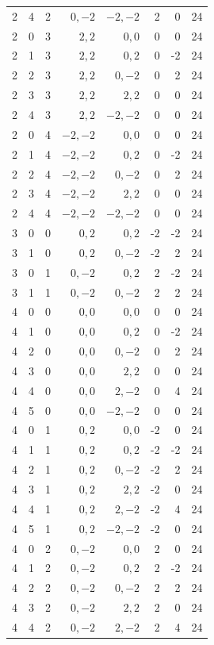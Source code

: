 \documentclass[11pt,a4paper]{article}
\begin{document}
\begin{longtable}{rrrrrrrr}
2 & 4 & 2 & $0,-2$ & $-2,-2$ & 2 & 0 & 24\\
2 & 0 & 3 & $2,2$ & $0,0$ & 0 & 0 & 24\\
2 & 1 & 3 & $2,2$ & $0,2$ & 0 & -2 & 24\\
2 & 2 & 3 & $2,2$ & $0,-2$ & 0 & 2 & 24\\
2 & 3 & 3 & $2,2$ & $2,2$ & 0 & 0 & 24\\
2 & 4 & 3 & $2,2$ & $-2,-2$ & 0 & 0 & 24\\
2 & 0 & 4 & $-2,-2$ & $0,0$ & 0 & 0 & 24\\
2 & 1 & 4 & $-2,-2$ & $0,2$ & 0 & -2 & 24\\
2 & 2 & 4 & $-2,-2$ & $0,-2$ & 0 & 2 & 24\\
2 & 3 & 4 & $-2,-2$ & $2,2$ & 0 & 0 & 24\\
2 & 4 & 4 & $-2,-2$ & $-2,-2$ & 0 & 0 & 24\\
3 & 0 & 0 & $0,2$ & $0,2$ & -2 & -2 & 24\\
3 & 1 & 0 & $0,2$ & $0,-2$ & -2 & 2 & 24\\
3 & 0 & 1 & $0,-2$ & $0,2$ & 2 & -2 & 24\\
3 & 1 & 1 & $0,-2$ & $0,-2$ & 2 & 2 & 24\\
4 & 0 & 0 & $0,0$ & $0,0$ & 0 & 0 & 24\\
4 & 1 & 0 & $0,0$ & $0,2$ & 0 & -2 & 24\\
4 & 2 & 0 & $0,0$ & $0,-2$ & 0 & 2 & 24\\
4 & 3 & 0 & $0,0$ & $2,2$ & 0 & 0 & 24\\
4 & 4 & 0 & $0,0$ & $2,-2$ & 0 & 4 & 24\\
4 & 5 & 0 & $0,0$ & $-2,-2$ & 0 & 0 & 24\\
4 & 0 & 1 & $0,2$ & $0,0$ & -2 & 0 & 24\\
4 & 1 & 1 & $0,2$ & $0,2$ & -2 & -2 & 24\\
4 & 2 & 1 & $0,2$ & $0,-2$ & -2 & 2 & 24\\
4 & 3 & 1 & $0,2$ & $2,2$ & -2 & 0 & 24\\
4 & 4 & 1 & $0,2$ & $2,-2$ & -2 & 4 & 24\\
4 & 5 & 1 & $0,2$ & $-2,-2$ & -2 & 0 & 24\\
4 & 0 & 2 & $0,-2$ & $0,0$ & 2 & 0 & 24\\
4 & 1 & 2 & $0,-2$ & $0,2$ & 2 & -2 & 24\\
4 & 2 & 2 & $0,-2$ & $0,-2$ & 2 & 2 & 24\\
4 & 3 & 2 & $0,-2$ & $2,2$ & 2 & 0 & 24\\
4 & 4 & 2 & $0,-2$ & $2,-2$ & 2 & 4 & 24\\

\end{longtable}
\end{document}
